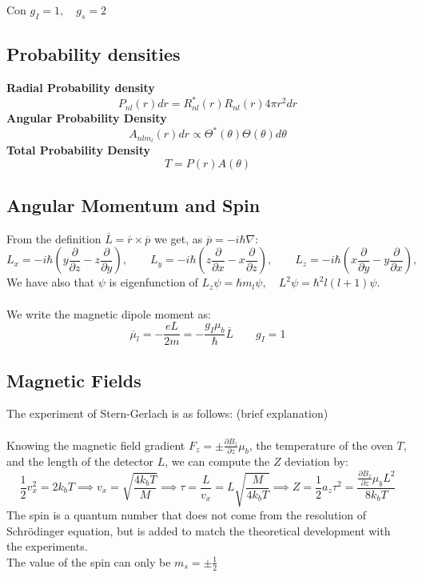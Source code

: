 \documentclass{myclass}
\newcommand{\h}{\hbar}
\newcommand{\N}{\nabla}
\begin{document}
Con $g_I = 1, \quad g_s = 2$

\subsection{Probability densities}
\textbf{Radial Probability density} \\
$$
\boxed{P_{nl}(r)dr = R_{nl}^*(r)R_{nl}(r)4\pi r^2dr} 
$$
\textbf{Angular Probability Density} \\
$$
\boxed{A_{nlm_l}(r)dr \propto \Theta^*(\theta)\Theta(\theta)d\theta} 
$$
\textbf{Total Probability Density} \\
$$
\boxed{T = P(r)A(\theta)} 
$$
\subsection{Angular Momentum and Spin}
From the definition $\overline{L} = \overline{r}\times \overline{p}$ we get, as $\overline{p} = -i\h \N  $:
 \[
L_x=-i\hbar\left(y\frac{\partial}{\partial z} - z\frac{\partial}{\partial y} \right), \qquad
L_y=-i\hbar\left(z\frac{\partial}{\partial x} - x\frac{\partial}{\partial z} \right), \qquad
L_z=-i\hbar\left(x\frac{\partial}{\partial y} - y\frac{\partial}{\partial x} \right), \qquad
\] 
We have also that $\psi$ is eigenfunction of $L_z\psi = \h m_l \psi, \quad L^2 \psi = \h^2l\left( l+1 \right)\psi $. \\
\\
We write the magnetic dipole moment as:
\[
\overline{\mu}_l = -\frac{eL}{2m} =-\frac{g_I\mu_b}{\h}\overline{L} \qquad g_I = 1
\] 
\subsection{Magnetic Fields}
The experiment of Stern-Gerlach is as follows: (brief explanation)\\
\\
Knowing the magnetic field gradient $\displaystyle F_z = \pm \frac{\partial B_z}{\partial z}\mu_b$, the temperature of the oven $T$, and the length of the detector $L$, we can compute the $Z$ deviation by:
\[
\frac{1}{2}v_x^2 = 2k_bT \implies v_x = \sqrt{\frac{4k_bT}{M}} \implies \tau = \frac{L}{v_x} = L\sqrt{\frac{M}{4k_bT}} \implies Z = \frac{1}{2} a_z \tau^2 = \frac{\frac{\partial B_z}{\partial z}\mu_bL^2}{8k_bT}  
\] 
The spin is a quantum number that does not come from the resolution of Schrödinger equation, but is added to match the theoretical development with the experiments. \\
The value of the spin can only be $m_s = \pm \frac{1}{2}$
\end{document}
